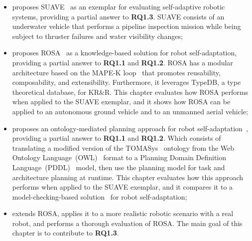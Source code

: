 \begin{itemize}
    \item \textbf{} proposes SUAVE~\cite{suave} as an exemplar for evaluating self-adaptive robotic systems, providing a partial answer to \textbf{RQ1.3}. SUAVE consists of an underwater vehicle that performs a pipeline inspection mission while being subject to thruster failures and water visibility changes;
    \item \textbf{} proposes ROSA~\cite{rosa} as a knowledge-based solution for robot self-adaptation, providing a partial answer to \textbf{RQ1.1} and \textbf{RQ1.2}. ROSA has a modular architecture based on the MAPE-K loop~\cite{kepharTheVision2003} that promotes reusability, composability, and extensibility. Furthermore, it leverages TypeDB\cite{dorn2023type}, a type theoretical database, for KR\&R. This chapter evaluates how ROSA performs when applied to the SUAVE exemplar, and it shows how ROSA can be applied to an autonomous ground vehicle and to an unmanned aerial vehicle;
    \item \textbf{} proposes an ontology-mediated planning approach for robot self-adaptation~\cite{silva2025planyour}, providing a partial answer to \textbf{RQ1.1} and \textbf{RQ1.2}. Which consists of translating a modified version of the TOMASys~\cite{corbato2013model} ontology from the Web Ontology Language~(OWL)~\cite{Antoniou2004} format to a Planning Domain Definition Language~(PDDL)~\cite{pddl} model, then use the planning model for task and architecture planning at runtime. This chapter evaluates how this approach performs when applied to the SUAVE exemplar, and it compares it to a model-checking-based solution~\cite{CAMARASoftwareArchitectureTask2020} for robot self-adaptation;
    \item \textbf{} extends ROSA, applies it to a more realistic robotic scenario with a real robot, and performs a thorough evaluation of ROSA. The main goal of this chapter is to contribute to \textbf{RQ1.3}.
\end{itemize}




